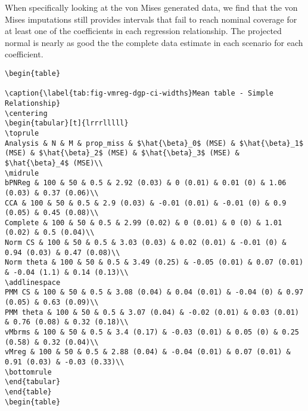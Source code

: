 \documentclass[
]{article}
\begin{document}
When specifically looking at the von Mises generated data, we find that
the von Mises imputations still provides intervals that fail to reach
nominal coverage for at least one of the coefficients in each regression
relationship. The projected normal is nearly as good the the complete
data estimate in each scenario for each coefficient.

\begin{verbatim}
\begin{table}

\caption{\label{tab:fig-vmreg-dgp-ci-widths}Mean table - Simple Relationship}
\centering
\begin{tabular}[t]{lrrrlllll}
\toprule
Analysis & N & M & prop_miss & $\hat{\beta}_0$ (MSE) & $\hat{\beta}_1$ (MSE) & $\hat{\beta}_2$ (MSE) & $\hat{\beta}_3$ (MSE) & $\hat{\beta}_4$ (MSE)\\
\midrule
bPNReg & 100 & 50 & 0.5 & 2.92 (0.03) & 0 (0.01) & 0.01 (0) & 1.06 (0.03) & 0.37 (0.06)\\
CCA & 100 & 50 & 0.5 & 2.9 (0.03) & -0.01 (0.01) & -0.01 (0) & 0.9 (0.05) & 0.45 (0.08)\\
Complete & 100 & 50 & 0.5 & 2.99 (0.02) & 0 (0.01) & 0 (0) & 1.01 (0.02) & 0.5 (0.04)\\
Norm CS & 100 & 50 & 0.5 & 3.03 (0.03) & 0.02 (0.01) & -0.01 (0) & 0.94 (0.03) & 0.47 (0.08)\\
Norm theta & 100 & 50 & 0.5 & 3.49 (0.25) & -0.05 (0.01) & 0.07 (0.01) & -0.04 (1.1) & 0.14 (0.13)\\
\addlinespace
PMM CS & 100 & 50 & 0.5 & 3.08 (0.04) & 0.04 (0.01) & -0.04 (0) & 0.97 (0.05) & 0.63 (0.09)\\
PMM theta & 100 & 50 & 0.5 & 3.07 (0.04) & -0.02 (0.01) & 0.03 (0.01) & 0.76 (0.08) & 0.32 (0.18)\\
vMbrms & 100 & 50 & 0.5 & 3.4 (0.17) & -0.03 (0.01) & 0.05 (0) & 0.25 (0.58) & 0.32 (0.04)\\
vMreg & 100 & 50 & 0.5 & 2.88 (0.04) & -0.04 (0.01) & 0.07 (0.01) & 0.91 (0.03) & -0.03 (0.33)\\
\bottomrule
\end{tabular}
\end{table}
\begin{table}


\end{verbatim}
\end{document}
